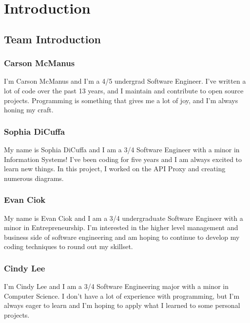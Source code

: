 \chapter{Introduction
  \label{Chapter::Introduction}}

\section{Team Introduction \label{Section::TeamIntroduction}}

\subsection{Carson McManus}

I'm Carson McManus and I'm a 4/5 undergrad Software Engineer. I've written a lot of code over the past 13 years, and I maintain and contribute to open source projects. Programming is something that gives me a lot of joy, and I'm always honing my craft.

\subsection{Sophia DiCuffa}

My name is Sophia DiCuffa and I am a 3/4 Software Engineer with a minor in Information Systems! I've been coding for five years and I am always excited to learn new things.
In this project, I worked on the API Proxy and creating numerous diagrams.

\subsection{Evan Ciok}

My name is Evan Ciok and I am a 3/4 undergraduate Software Engineer with a minor in Entrepreneurship. I'm interested in the higher level management and business side of software engineering and am hoping to continue to develop my coding techniques to round out my skillset.

\subsection{Cindy Lee}

I'm Cindy Lee and I am a 3/4 Software Engineering major with a minor in Computer Science. I don't have a lot of experience with programming, but I'm always eager to learn and I'm hoping to apply what I learned to some personal projects.